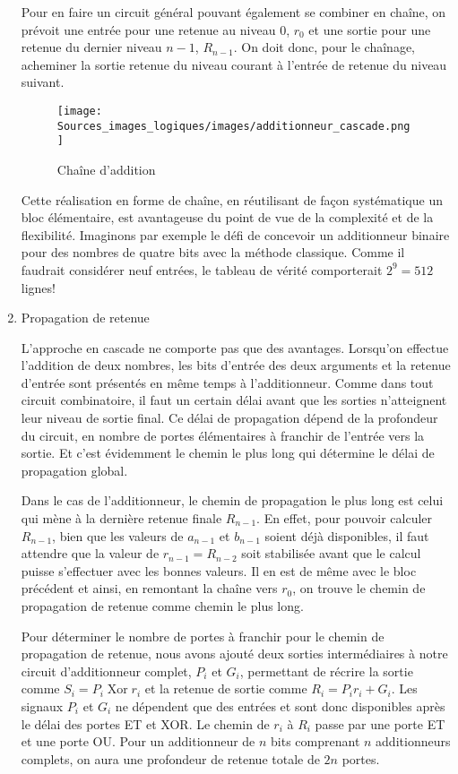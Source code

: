 \documentclass[letter, oneside]{book}
\begin{document}
\begin{enumerate}
Pour en faire un circuit général pouvant également se combiner en
chaîne, on prévoit une entrée pour une retenue au niveau 0, \(r_0\) et
une sortie pour une retenue du dernier niveau \(n-1\), \(R_{n-1}\). On
doit donc, pour le chaînage, acheminer la sortie retenue du niveau
courant à l'entrée de retenue du niveau suivant.


\begin{figure}[htbp]
\centering
\texttt{[image: Sources\_images\_logiques/images/additionneur\_cascade.png]}
\caption{\label{fig:orgb6ebc19}Chaîne d'addition}
\end{figure}

Cette réalisation en forme de chaîne, en réutilisant de façon
systématique un bloc élémentaire, est avantageuse du point de vue de
la complexité et de la flexibilité. Imaginons par exemple le défi de
concevoir un additionneur binaire pour des nombres de quatre bits avec
la méthode classique. Comme il faudrait considérer neuf entrées, le
tableau de vérité comporterait \(2^9= 512\) lignes!

\item Propagation de retenue
\label{sec:orgf16b48c}

L'approche en cascade ne comporte pas que des avantages. Lorsqu'on
effectue l'addition de deux nombres, les bits d'entrée des deux
arguments et la retenue d'entrée sont présentés en même temps à
l'additionneur.  Comme dans tout circuit combinatoire, il faut un
certain délai avant que les sorties n'atteignent leur niveau de sortie
final.  Ce délai de propagation dépend de la profondeur du circuit, en
nombre de portes élémentaires à franchir de l'entrée vers la
sortie.  Et c'est évidemment le chemin le plus long qui détermine le
délai de propagation global.  

Dans le cas de l'additionneur, le chemin de propagation le plus long
est celui qui mène à la dernière retenue finale \(R_{n-1}\).  En
effet, pour pouvoir calculer \(R_{n-1}\), bien que les valeurs de
\(a_{n-1}\) et \(b_{n-1}\) soient déjà disponibles, il faut attendre
que la valeur de \(r_{n-1} = R_{n-2}\) soit stabilisée avant que le
calcul puisse s'effectuer avec les bonnes valeurs. Il en est de même
avec le bloc précédent et ainsi, en remontant la chaîne vers \(r_0\),
on trouve le chemin de propagation de retenue comme chemin le plus
long.

Pour déterminer le nombre de portes à franchir pour le chemin de
propagation de retenue, nous avons ajouté deux sorties intermédiaires
à notre circuit d'additionneur complet, \(P_i\) et \(G_i\), permettant
de récrire la sortie comme \(S_i = P_i  \operatorname{Xor} r_i\) et la retenue de
sortie comme \(R_i = P_i r_i + G_i\). Les signaux \(P_i\) et \(G_i\)
ne dépendent que des entrées et sont donc disponibles après le délai
des portes ET et XOR. Le chemin de \(r_i\) à \(R_i\) passe par une
porte ET et une porte OU. Pour un additionneur de \(n\) bits
comprenant \(n\) additionneurs complets, on aura une profondeur de
retenue totale de \(2n\) portes.



\end{enumerate}
\end{document}
